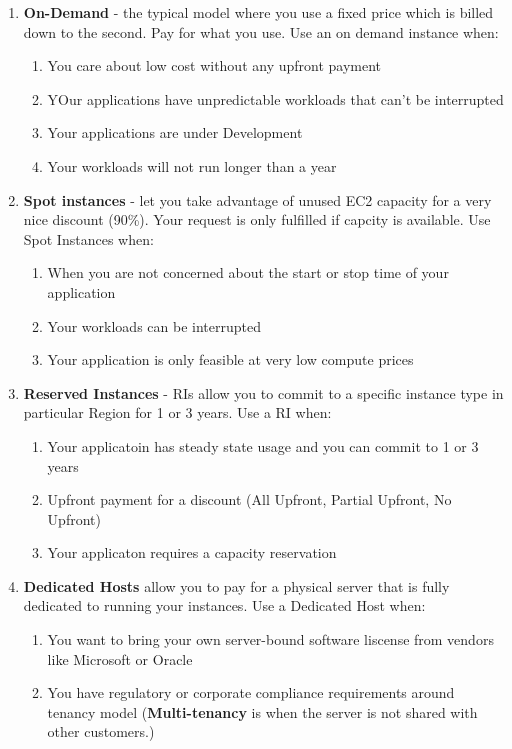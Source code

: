 \documentclass{article}%
\begin{document}
\begin{enumerate}
    \item \textbf{On-Demand} - the typical model where you use a fixed price which is billed down to the second. Pay for what you use. Use an on demand instance when:
    \begin{enumerate}
        \item You care about low cost without any upfront payment
        \item YOur applications have unpredictable workloads that can't be interrupted
        \item Your applications are under Development
        \item Your workloads will not run longer than a year
    \end{enumerate}
    \item \textbf{Spot instances} - let you take advantage of unused EC2 capacity for a very nice discount (90\%). Your request is only fulfilled if capcity is available. Use Spot Instances when:
    \begin{enumerate}
        \item When you are not concerned about the start or stop time of your application
        \item Your workloads can be interrupted
        \item Your application is only feasible at very low compute prices
    \end{enumerate}
    \item \textbf{Reserved Instances} - RIs allow you to commit to a specific instance type in particular Region for 1 or 3 years. Use a RI when:
    \begin{enumerate}
        \item Your applicatoin has steady state usage and you can commit to 1 or 3 years
        \item Upfront payment for a discount (All Upfront, Partial Upfront, No Upfront)
        \item Your applicaton requires a capacity reservation
    \end{enumerate}
    \item \textbf{Dedicated Hosts} allow you to pay for a physical server that is fully dedicated to running your instances. Use a Dedicated Host when:
    \begin{enumerate}
        \item You want to bring your own server-bound software liscense from vendors like Microsoft or Oracle
        \item You have regulatory or corporate compliance requirements around tenancy model (\textbf{Multi-tenancy} is when the server is not shared with other customers.)

\end{enumerate}
\end{enumerate}
\end{document}
